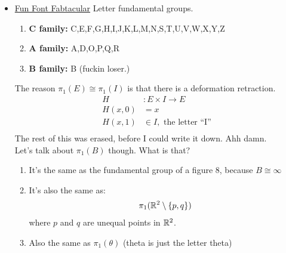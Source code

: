 \documentclass[../notes.tex]{subfiles}
\begin{document}
\begin{itemize}
    \item \underline{Fun Font Fabtacular}
        Letter fundamental groups.
        \begin{enumerate}
            \item \textbf{C family:} C,E,F,G,H,I,J,K,L,M,N,S,T,U,V,W,X,Y,Z
            \item \textbf{A family:} A,D,O,P,Q,R
            \item \textbf{B family:} B (fuckin loser.)
        \end{enumerate}
        The reason $\pi_1(E)\cong\pi_1(I)$ is that there
        is a deformation retraction.
        \begin{align*}
            H&: E\times I \rightarrow E\\
            H(x,0)&=x\\
            H(x,1)&\in I, \text{ the letter ``I'' }\\
        \end{align*}
        The rest of this was erased, before I could write it down. Ahh damn.\\
        Let's talk about $\pi_1(B)$ though. What is that?
        \begin{enumerate}
            \item It's the same as the fundamental group of a figure 8, because $B\cong \infty$
            \item It's also the same as:
                \begin{align*}
                    \pi_1(\mathbb{R}^2\setminus \{p,q\})\\
                \end{align*}
                where $p$ and $q$ are unequal points in $\mathbb{R}^2$.
            \item Also the same as $\pi_1(\theta)$ (theta is just the letter theta)
                
        \end{enumerate}
\end{itemize}
\end{document}
